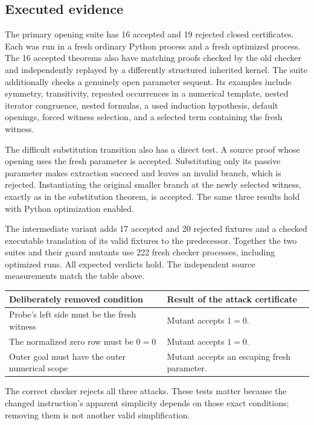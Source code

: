 \subsection{Executed evidence}

The primary opening suite has 16 accepted and 19 rejected closed
certificates.  Each was run in a fresh ordinary Python process and a fresh
optimized process.  The 16 accepted theorems also have matching proofs
checked by the old checker and independently replayed by a differently
structured inherited kernel.  The suite additionally checks a genuinely
open parameter sequent.  Its examples include symmetry, transitivity,
repeated occurrences in a numerical template, nested iterator congruence,
nested formulas, a used induction hypothesis, default openings, forced
witness selection, and a selected term containing the fresh witness.

The difficult substitution transition also has a direct test. A source
proof whose opening uses the fresh parameter is accepted. Substituting
only its passive parameter makes extraction succeed and leaves an invalid
branch, which is rejected. Instantiating the original smaller branch at
the newly selected witness, exactly as in the substitution theorem, is
accepted. The same three results hold with Python optimization enabled.

The intermediate variant adds 17 accepted and 20 rejected fixtures and a
checked executable translation of its valid fixtures to the predecessor.
Together the two suites and their guard mutants use 222 fresh checker
processes, including optimized runs.  All expected verdicts hold.
The independent source measurements match the table above.

\begin{center}
\begin{tabular}{p{.35\linewidth}p{.53\linewidth}}
\toprule
Deliberately removed condition & Result of the attack certificate\\
\midrule
Probe's left side must be the fresh witness & Mutant accepts $1=0$.\\
The normalized zero row must be $0=0$ & Mutant accepts $1=0$.\\
Outer goal must have the outer numerical scope & Mutant accepts an escaping fresh parameter.\\
\bottomrule
\end{tabular}
\end{center}

The correct checker rejects all three attacks.  These tests matter because
the changed instruction's apparent simplicity depends on those exact
conditions; removing them is not another valid simplification.

